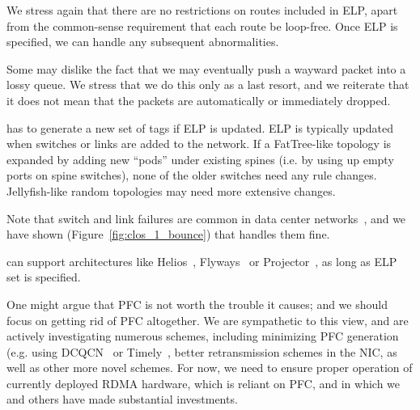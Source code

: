 We stress again that there are no restrictions on routes included in ELP, apart
from the common-sense requirement that each route be loop-free. Once ELP is
specified, we can handle any subsequent abnormalities.

 Some may dislike the fact that we may eventually push
a wayward packet into a lossy queue. We stress that we do this only as a last
resort, and we reiterate that it does not mean that the packets are
automatically or immediately dropped.

 \sysname{} has to generate a new set of tags if ELP is
updated.  ELP is typically updated when switches or links are added to the
network. If a FatTree-like topology is expanded by adding new ``pods'' under
existing spines (i.e. by using up empty ports on spine switches), none of the
older switches need any rule changes.  Jellyfish-like random topologies may need
more extensive changes.

Note that switch and link failures are common in data center
networks~\cite{netpilot}, and we have shown
(Figure~\ref{fig:clos_1_bounce}) that \sysname{} handles them fine. 

 \sysname{} can support architectures
like Helios~\cite{helios}, Flyways~\cite{flyways} or Projector~\cite{projector},
as long as ELP set is specified.

 One might argue that PFC is not worth the trouble it
causes; and we should focus on getting rid of PFC altogether.  We are
sympathetic to this view, and are actively investigating numerous schemes,
including minimizing PFC generation (e.g.  using DCQCN~\cite{dcqcn} or
Timely~\cite{timely}, better retransmission schemes in the NIC, as well as other
more novel schemes.  For now, we need \sysname{} to ensure proper operation of
currently deployed RDMA hardware, which is reliant on PFC, and in which we and
others have made substantial investments.

